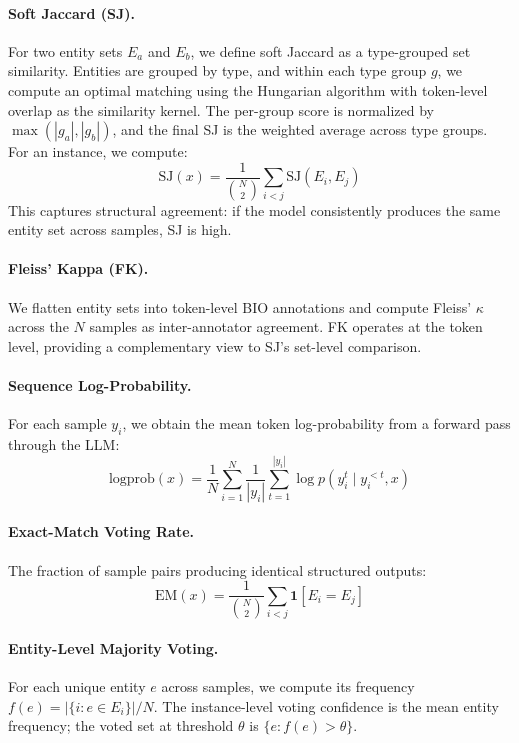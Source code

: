 \documentclass[11pt,a4paper]{article}
\begin{document}
\paragraph{Soft Jaccard (SJ).}
For two entity sets $E_a$ and $E_b$, we define soft Jaccard as a type-grouped set similarity. Entities are grouped by type, and within each type group $g$, we compute an optimal matching using the Hungarian algorithm with token-level overlap as the similarity kernel. The per-group score is normalized by $\max(|g_a|, |g_b|)$, and the final SJ is the weighted average across type groups. For an instance, we compute:
\begin{equation}
\text{SJ}(x) = \frac{1}{\binom{N}{2}} \sum_{i < j} \text{SJ}(E_i, E_j)
\end{equation}
This captures structural agreement: if the model consistently produces the same entity set across samples, SJ is high.

\paragraph{Fleiss' Kappa (FK).}
We flatten entity sets into token-level BIO annotations and compute Fleiss' $\kappa$~\cite{fleiss1971measuring} across the $N$ samples as inter-annotator agreement. FK operates at the token level, providing a complementary view to SJ's set-level comparison.

\paragraph{Sequence Log-Probability.}
For each sample $y_i$, we obtain the mean token log-probability from a forward pass through the LLM:
\begin{equation}
\text{logprob}(x) = \frac{1}{N} \sum_{i=1}^{N} \frac{1}{|y_i|} \sum_{t=1}^{|y_i|} \log p(y_i^t \mid y_i^{<t}, x)
\end{equation}

\paragraph{Exact-Match Voting Rate.}
The fraction of sample pairs producing identical structured outputs:
\begin{equation}
\text{EM}(x) = \frac{1}{\binom{N}{2}} \sum_{i < j} \mathbf{1}[E_i = E_j]
\end{equation}

\paragraph{Entity-Level Majority Voting.}
For each unique entity $e$ across samples, we compute its frequency $f(e) = |\{i : e \in E_i\}| / N$. The instance-level voting confidence is the mean entity frequency; the voted set at threshold $\theta$ is $\{e : f(e) > \theta\}$.
\end{document}
